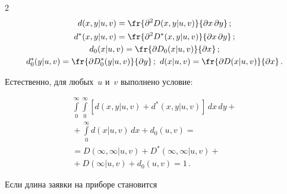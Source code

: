 \begin{multicols}{2}
\begin{gather*}
d(x,y|u,v)=\fr{\partial^2 D(x,y|u,v)}{\partial x\, \partial y}\,;\\


d^*(x,y|u,v)=\fr{\partial^2 D^*(x,y|u,v)}{\partial x\, \partial y}\,;\\


d_0(x|u,v)= \fr{\partial D_0(x|u,v)}{\partial x}\,;\\


d_0^*(y|u,v)=\fr{\partial D_0^*(y|u,v)}{\partial y}\,;\


d(x|u,v)=\fr{\partial D(x|u,v)}{\partial x}\,.


\end{gather*}








Естественно, для любых~$u$ и~$v$ выполнено условие:





\vspace*{-2pt}





\noindent


\begin{multline*}




\int\limits_0^\infty \int\limits_0^\infty


\left[d(x,y|u,v) + d^*(x,y|u,v)\right] \,dx\,dy


+{}\\[-6pt]


{}+ \int\limits_0^\infty d(x|u,v) \,dx +


d_0(u,v) ={}\\


{}=


D(\infty,\infty|u,v)+D^*(\infty,\infty|u,v)


+{}\\


{}+ D(\infty|u,v) + d_0(u,v) = 1\,.




\end{multline*}











Если длина заявки на приборе становится



\end{multicols}
